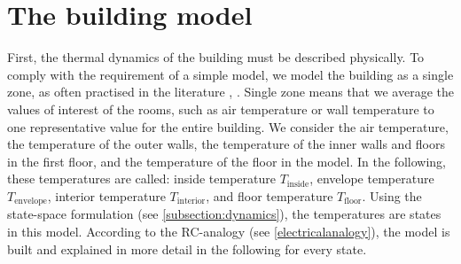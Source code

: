     \section{The building model}
    \label{sec:building model}
    First, the thermal dynamics of the building must be described physically. To comply with the requirement of a simple model, we model the building as a single zone, as often practised in the literature \cite{Park.2011}, \cite{Hazyuk.2012}. Single zone means that we average the values of interest of the rooms, such as air temperature or wall temperature to one representative value for the entire building. 
    \newline
    We consider the air temperature, the temperature of the outer walls, the temperature of the inner walls and floors in the first floor, and the temperature of the floor in the model. In the following, these temperatures are called: inside temperature  $T_\text{inside}$, envelope temperature $T_\text{envelope}$, interior temperature $T_\text{interior}$, and floor temperature $T_\text{floor}$. 
    Using the state-space formulation (see \autoref{subsection:dynamics}), the temperatures are states in this model. According to the RC-analogy (see \autoref{electricalanalogy}), the model is built and explained in more detail in the following for every state. \newline
    
